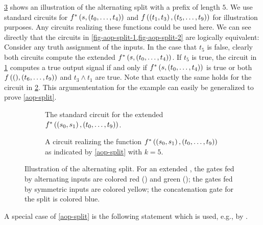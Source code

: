 \cref{fig-aop-split} shows an illustration of the alternating split
with a prefix of length $5$.
We use standard circuits for $f^*\left({s, \left({t_0, \dotsc, t_4}\right)}\right)$
and $f\left({\left({t_1, t_3}\right), \left({t_5, \dotsc, t_{9}}\right)}\right)$
for illustration purposes.
Any circuits realizing these functions could be used here.
We can see directly that the circuits in \cref{fig-aop-split-1,fig-aop-split-2}
are logically equivalent:
Consider any truth assignment of the inputs.
In the case that $t_5$ is false, clearly both circuits
compute the extended \aop{} $f^*\left({s, \left({t_0, \dotsc, t_4}\right)}\right)$.
If $t_5$ is true, the circuit in \cref{fig-aop-split-1}
computes a true output signal if and only if $f^*\left({s, \left({t_0, \dotsc, t_4}\right)}\right)$
is true or both $f\left({(), \left({t_6, \dotsc, t_9}\right)}\right)$ and
$t_3 \land t_1$ are true.
Note that exactly the same holds for the circuit in \cref{fig-aop-split-2}.
This argumententation for the example can easily be generalized to prove
\cref{aop-split}.

\begin{figure}[t]
  \begin{center}
  \begin{subfigure}[t]{0.47\textwidth}
  \caption{The standard \aop{} circuit for the extended \aop{} $f^*\left({\left({s_0, s_1}\right), \left({t_0, \dotsc, t_{9}}\right)}\right)$.}
  \label{fig-aop-split-1}
 \end{subfigure}
 \hfill
 \begin{subfigure}[t]{0.47\textwidth}
   \caption{A circuit realizing the function $f^*\left({\left({s_0, s_1}\right), \left({t_0, \dotsc, t_{9}}\right)}\right)$ as indicated by \cref{aop-split} with $k = 5$.}
  \label{fig-aop-split-2}
  \end{subfigure}
  \end{center}
 \caption{Illustration of the alternating split.
 For an extended \aop{},
 the gates fed by alternating inputs are colored red (\AND) and green (\OR);
 the gates fed by symmetric inputs are colored yellow;
 the concatenation gate for the split is colored blue.}
 \label{fig-aop-split}
\end{figure}

A special case of \cref{aop-split} is
the following statement which is used, e.g., by \citet{Werber-Fib-AOPs}.

